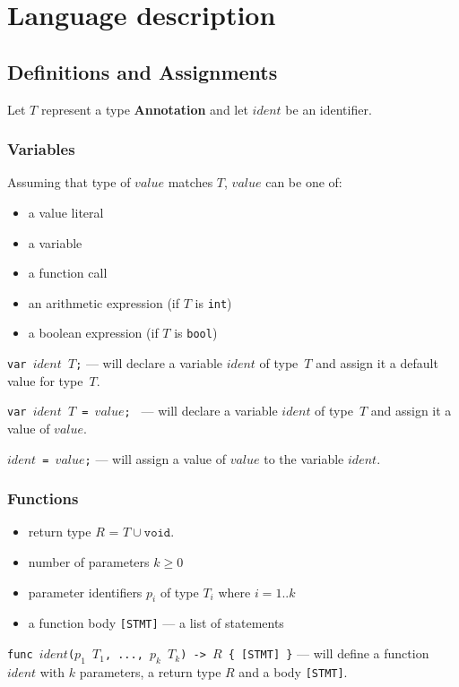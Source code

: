 \documentclass{article}
\begin{document}
\section{Language description}

\subsection{Definitions and Assignments}
\label{def}
Let $T$ represent a type \textbf{Annotation} and let $ident$ be an identifier.

\subsubsection{Variables}
Assuming that type of $value$ matches $T$, $value$ can be one of:
\begin{itemize}
  \setlength\itemsep{.1em}
  \item a value literal
  \item a variable
  \item a function call
  \item an arithmetic expression (if $T$ is \texttt{int})
  \item a boolean expression (if $T$ is \texttt{bool})
\end{itemize}

\texttt{var $ident$ $T$;} --- will declare a variable $ident$ of type~$T$ and
assign it a default value for type~$T$.

\texttt{var $ident$ $T$ = $value$; } --- will declare a variable $ident$ of
type~$T$ and assign it a value of $value$.

\texttt{$ident$ = $value$;} --- will assign a value of $value$ to the variable
$ident$.

\subsubsection{Functions}
\label{def-functions}
\begin{itemize}
  \setlength\itemsep{.1em}
  \item return type $R$ = $T \cup { \texttt{void} }$.
  \item number of parameters $k \geq 0$
  \item parameter identifiers $p_i$ of type $T_i$ where $i = 1..k$
  \item a function body \texttt{[STMT]} --- a list of statements
\end{itemize}

\texttt{func $ident$($p_1$ $T_1$, ..., $p_k$ $T_k$) -> $R$ \{ [STMT] \}} --- will
define a function $ident$ with $k$ parameters, a return type $R$ and a body
\texttt{[STMT]}.
\end{document}
